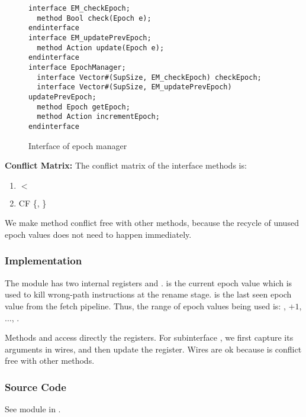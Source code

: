 \begin{figure}
\begin{lstlisting}[caption={}]
interface EM_checkEpoch;
  method Bool check(Epoch e);
endinterface
interface EM_updatePrevEpoch;
  method Action update(Epoch e);
endinterface
interface EpochManager;
  interface Vector#(SupSize, EM_checkEpoch) checkEpoch;
  interface Vector#(SupSize, EM_updatePrevEpoch) updatePrevEpoch;
  method Epoch getEpoch;
  method Action incrementEpoch;
endinterface
\end{lstlisting}
\caption{Interface of epoch manager}\label{fig:epoch-ifc}
\end{figure}

\noindent\textbf{Conflict Matrix:}
The conflict matrix of the interface methods is:
\begin{enumerate}
    \item {} $<$ 
    \item {} CF \{, \}
\end{enumerate}
We make method  conflict free with other methods, because the recycle of unused epoch values does not need to happen immediately.

\subsubsection{Implementation}
The module has two internal registers  and .
 is the current epoch value which is used to kill wrong-path instructions at the rename stage.
 is the last seen epoch value from the fetch pipeline.
Thus, the range of epoch values being used is: , $+1$, $\ldots$, .

Methods  and  access directly the registers.
For subinterface , we first capture its arguments in wires, and then update the  register.
Wires are ok because  is conflict free with other methods.

\subsubsection{Source Code}
See module  in .        
